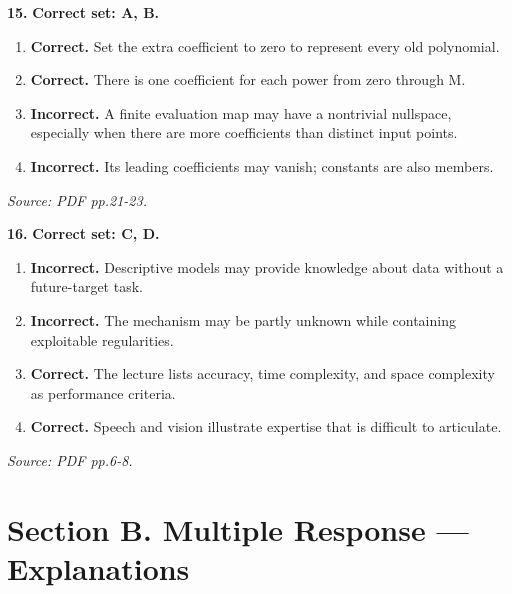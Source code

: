 \documentclass[11pt,a4paper]{article}
\begin{document}
\par\noindent\begin{minipage}{\linewidth}
\textbf{15.} \textbf{Correct set: A, B.}
\begin{enumerate}[label=(\Alph*),leftmargin=8mm,itemsep=2pt,topsep=2pt]
\item \textbf{Correct.} Set the extra coefficient to zero to represent every old polynomial.
\item \textbf{Correct.} There is one coefficient for each power from zero through M.
\item \textbf{Incorrect.} A finite evaluation map may have a nontrivial nullspace, especially when there are more coefficients than distinct input points.
\item \textbf{Incorrect.} Its leading coefficients may vanish; constants are also members.
\end{enumerate}
{\footnotesize\textit{Source: PDF pp.21-23.}}

\end{minipage}\par\vspace{3mm}
\par\noindent\begin{minipage}{\linewidth}
\textbf{16.} \textbf{Correct set: C, D.}
\begin{enumerate}[label=(\Alph*),leftmargin=8mm,itemsep=2pt,topsep=2pt]
\item \textbf{Incorrect.} Descriptive models may provide knowledge about data without a future-target task.
\item \textbf{Incorrect.} The mechanism may be partly unknown while containing exploitable regularities.
\item \textbf{Correct.} The lecture lists accuracy, time complexity, and space complexity as performance criteria.
\item \textbf{Correct.} Speech and vision illustrate expertise that is difficult to articulate.
\end{enumerate}
{\footnotesize\textit{Source: PDF pp.6-8.}}

\end{minipage}\par\vspace{3mm}
\newpage\section*{Section B. Multiple Response --- Explanations}
\end{document}
